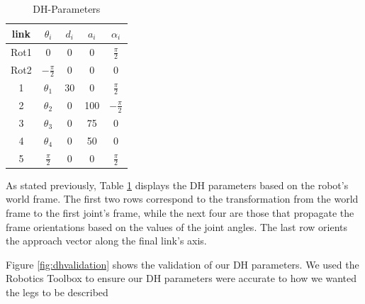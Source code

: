 \begin{table}
    \begin{center}
        \begin{tabular}{ | c | c | c | c | c |}
            \hline
            link & $\theta_i$       & $d_i$ & $a_i$ & $\alpha_i$       \\
            \hline
            Rot1 & 0                & 0     & 0     & $\frac{\pi}{2}$  \\
            \hline
            Rot2 & $-\frac{\pi}{2}$ & 0     & 0     & 0                \\
            \hline
            1    & $\theta_1$       & 30    & 0     & $\frac{\pi}{2}$  \\
            \hline
            2    & $\theta_2$       & 0     & 100   & $-\frac{\pi}{2}$ \\
            \hline
            3    & $\theta_3$       & 0     & 75    & 0                \\
            \hline
            4    & $\theta_4$       & 0     & 50    & 0                \\
            \hline
            5    & $\frac{\pi}{2}$  & 0     & 0     & $\frac{\pi}{2}$  \\
            \hline
        \end{tabular}
    \end{center}
    \caption{DH-Parameters}
    \label{tab:dhparams}
\end{table}

As stated previously, Table \ref{tab:dhparams} displays the DH parameters based on the robot's world frame. The first two rows correspond to the transformation from the world frame to the first joint's frame, while the next four are those that propagate the frame orientations based on the values of the joint angles. The last row orients the approach vector along the final link's axis.

Figure \ref{fig:dhvalidation} shows the validation of our DH parameters. We used the Robotics Toolbox to ensure our DH parameters were accurate to how we wanted the legs to be described

